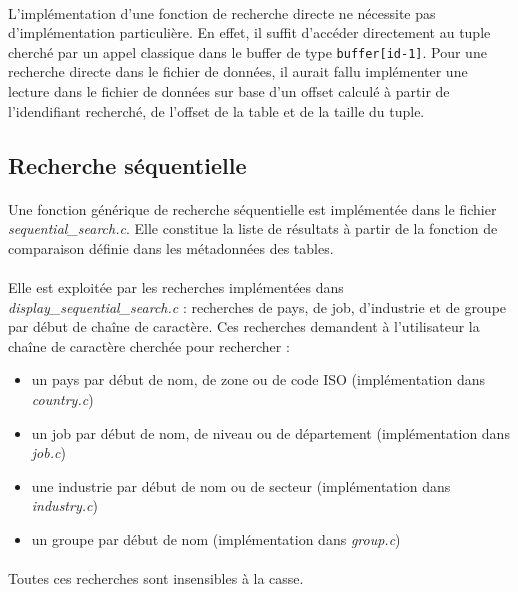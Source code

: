 \documentclass{article}
\begin{document}
    \paragraph{}
    L'implémentation d'une fonction de recherche directe ne nécessite pas d'implémentation particulière. En effet, il suffit d'accéder directement au tuple cherché par un appel classique dans le buffer de type \texttt{buffer[id-1]}. Pour une recherche directe dans le fichier de données, il aurait fallu implémenter une lecture dans le fichier de données sur base d'un offset calculé à partir de l'idendifiant recherché, de l'offset de la table et de la taille du tuple.


    \subsection{Recherche séquentielle}
    \paragraph{}
    Une fonction générique de recherche séquentielle est implémentée dans le fichier \emph{sequential\_search.c}. Elle constitue la liste de résultats à partir de la fonction de comparaison définie dans les métadonnées des tables.

    \paragraph{}
    Elle est exploitée par les recherches implémentées dans \emph{display\_sequential\_search.c} : recherches de pays, de job, d'industrie et de groupe par début de chaîne de caractère. Ces recherches demandent à l'utilisateur la chaîne de caractère cherchée pour rechercher :
    \begin{itemize}[label=$\bullet$]
        \item un pays par début de nom, de zone ou de code ISO (implémentation dans \emph{country.c})
        \item un job par début de nom, de niveau ou de département (implémentation dans \emph{job.c})
        \item une industrie par début de nom ou de secteur (implémentation dans \emph{industry.c})
        \item un groupe par début de nom (implémentation dans \emph{group.c})
    \end{itemize}

    \paragraph{}
    Toutes ces recherches sont insensibles à la casse.
\end{document}

